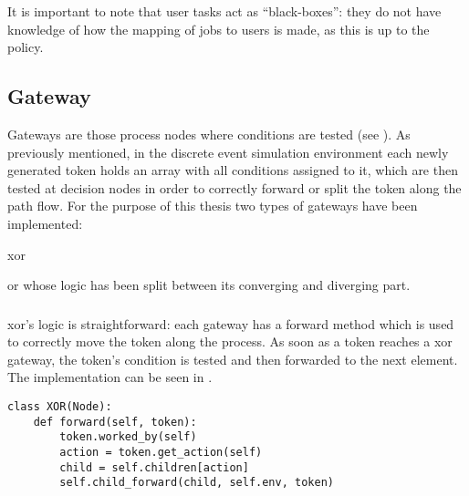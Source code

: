 It is important to note that user tasks act as ``black-boxes'': they do not have knowledge of how the mapping of jobs to users is made, as this is up to the policy.

\subsection{Gateway}

Gateways are those process nodes where conditions are tested (see ). As previously mentioned, in the discrete event simulation environment each newly generated token holds an array with all conditions assigned to it, which are then tested at decision nodes in order to correctly forward or split the token along the path flow. For the purpose of this thesis two types of gateways have been implemented:
\begin{enumerate*}
     \item \gls{xor}
     \item \gls{or} whose logic has been split between its converging and diverging part.
 \end{enumerate*} 

\subsubsection{}

\gls{xor}'s logic is straightforward: each gateway has a forward method which is used to correctly move the token along the process. As soon as a token reaches a \gls{xor} gateway, the token's condition is tested and then forwarded to the next element. The implementation can be seen in . 

\begin{lstlisting}[caption=\glsentryshort{xor}'s forward method in which the to be forwarded to node is retrieved from the token path by looking for the corresponding value with the node id. Eventually a call to the \glsentryshort{xor}'s forward method is made.,label=lst:xor_forward,style=CustomPython]
class XOR(Node):
    def forward(self, token):
        token.worked_by(self)
        action = token.get_action(self)
        child = self.children[action]
        self.child_forward(child, self.env, token)
\end{lstlisting}

\subsubsection{}

